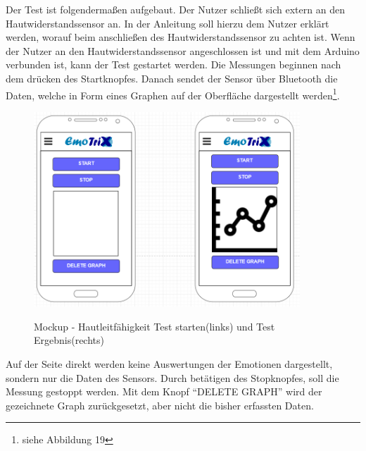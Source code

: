 Der Test ist folgendermaßen aufgebaut. Der Nutzer schließt sich extern an den Hautwiderstandssensor an. In der Anleitung soll hierzu dem Nutzer erklärt werden, worauf beim anschließen des Hautwiderstandssensor zu achten ist. Wenn der Nutzer an den Hautwiderstandssensor angeschlossen ist und mit dem Arduino verbunden ist, kann der Test gestartet werden. Die Messungen beginnen nach dem drücken des Startknopfes. Danach sendet der Sensor über Bluetooth die Daten, welche in Form eines Graphen auf der Oberfläche dargestellt werden\footnote{siehe Abbildung 19}. 
\begin{figure}[h]
	\centering
	\includegraphics[width=10cm]{Bilder/Mockup-GSR.png}
	\label{img:Mockup-GSR}
	\caption[Mockup - Hautleitfähigkeit Test starten(links) und Test Ergebnis(rechts)]{Mockup - Hautleitfähigkeit Test starten(links) und Test Ergebnis(rechts)}
\end{figure}%
Auf der Seite direkt werden keine Auswertungen der Emotionen dargestellt, sondern nur die Daten des Sensors. Durch betätigen des Stopknopfes, soll die Messung gestoppt werden. Mit dem Knopf ``DELETE GRAPH'' wird der gezeichnete Graph zurückgesetzt, aber nicht die bisher erfassten Daten.
